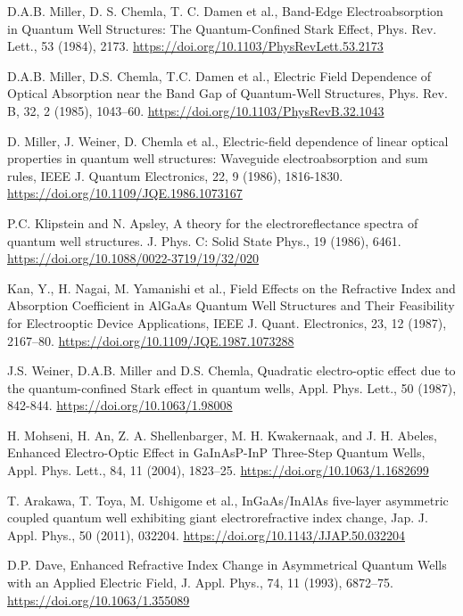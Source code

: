 \documentclass[a4paper,14pt]{extarticle}
\begin{document}
\begin{thebibliography}{99}

     D.A.B. Miller, D. S. Chemla, T. C. Damen et al., Band-Edge Electroabsorption in Quantum Well Structures: The Quantum-Confined Stark Effect, Phys. Rev. Lett., 53 (1984), 2173. \url{https://doi.org/10.1103/PhysRevLett.53.2173}

     D.A.B. Miller, D.S. Chemla, T.C. Damen et al., Electric Field Dependence of Optical Absorption near the Band Gap of Quantum-Well Structures, Phys. Rev. B, 32, 2 (1985), 1043–60. \url{https://doi.org/10.1103/PhysRevB.32.1043}
    
     D. Miller, J. Weiner, D. Chemla et al., Electric-field dependence of linear optical properties in quantum well structures: Waveguide electroabsorption and sum rules, IEEE J. Quantum Electronics, 22, 9 (1986), 1816-1830. \url{https://doi.org/10.1109/JQE.1986.1073167}
    
     P.C. Klipstein and N. Apsley, A theory for the electroreflectance spectra of quantum well structures. J. Phys. C: Solid State Phys., 19 (1986), 6461. \url{https://doi.org/10.1088/0022-3719/19/32/020}
    
     Kan, Y., H. Nagai, M. Yamanishi et al., Field Effects on the Refractive Index and Absorption Coefficient in AlGaAs Quantum Well Structures and Their Feasibility for Electrooptic Device Applications, IEEE J. Quant. Electronics, 23, 12 (1987), 2167–80. \url{https://doi.org/10.1109/JQE.1987.1073288}
    
     J.S. Weiner, D.A.B. Miller and D.S. Chemla, Quadratic electro-optic effect due to the quantum-confined Stark effect in quantum wells, Appl. Phys. Lett., 50 (1987), 842-844. \url{https://doi.org/10.1063/1.98008}
    
     H. Mohseni, H. An, Z. A. Shellenbarger, M. H. Kwakernaak, and J. H. Abeles, Enhanced Electro-Optic Effect in GaInAsP-InP Three-Step Quantum Wells, Appl. Phys. Lett., 84, 11 (2004), 1823–25. \url{https://doi.org/10.1063/1.1682699}
    
     T. Arakawa, T. Toya, M. Ushigome et al., InGaAs/InAlAs five-layer asymmetric coupled quantum well exhibiting giant electrorefractive index change, Jap. J. Appl. Phys., 50 (2011), 032204. \url{https://doi.org/10.1143/JJAP.50.032204}
    
     D.P. Dave, Enhanced Refractive Index Change in Asymmetrical Quantum Wells with an Applied Electric Field, J. Appl. Phys., 74, 11 (1993), 6872–75. \url{https://doi.org/10.1063/1.355089}
    

\end{thebibliography}
\end{document}
